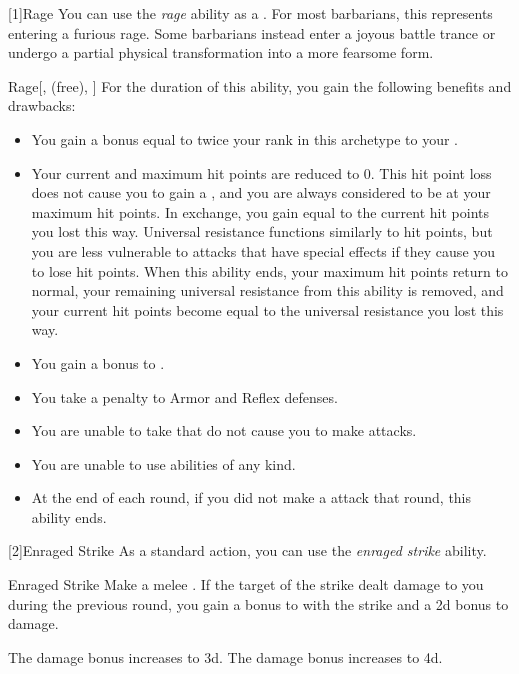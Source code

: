         [1]{Rage} You can use the \textit{rage} ability as a .
        For most barbarians, this represents entering a furious rage.
        Some barbarians instead enter a joyous battle trance or undergo a partial physical transformation into a more fearsome form.
        \begin{attuneability}{Rage}[,  (free), ]
            For the duration of this ability, you gain the following benefits and drawbacks:
            \begin{itemize}
                \item You gain a bonus equal to twice your rank in this archetype to your  .
                \item Your current  and maximum hit points are reduced to 0.
                    This hit point loss does not cause you to gain a , and you are always considered to be at your maximum hit points.
                    In exchange, you gain  equal to the current hit points you lost this way.
                    Universal resistance functions similarly to hit points, but you are less vulnerable to attacks that have special effects if they cause you to lose hit points.
                    When this ability ends, your maximum hit points return to normal, your remaining universal resistance from this ability is removed, and your current hit points become equal to the universal resistance you lost this way.
                \item You gain a  bonus to .
                \item You take a  penalty to Armor and Reflex defenses.
                \item You are unable to take  that do not cause you to make  attacks.
                \item You are unable to use  abilities of any kind.
                \item At the end of each round, if you did not make a  attack that round, this ability ends.
            \end{itemize}
        \end{attuneability}

        [2]{Enraged Strike} As a standard action, you can use the \textit{enraged strike} ability.
        \begin{freeability}{Enraged Strike}
            Make a melee .
            If the target of the strike dealt damage to you during the previous round, you gain a  bonus to  with the strike and a \plus2d bonus to damage.

            \rankline
             The damage bonus increases to \plus3d.
             The damage bonus increases to \plus4d.
        \end{freeability}

